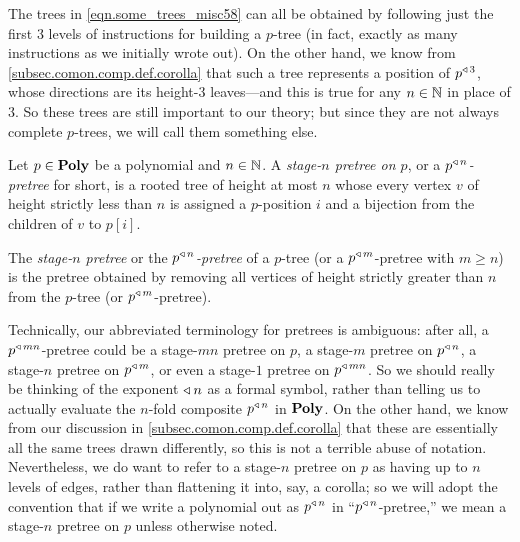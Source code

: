 \documentclass[Book-Poly]{subfiles}
\begin{document}
The trees in \eqref{eqn.some_trees_misc58} can all be obtained by following just the first $3$ levels of instructions for building a $p$-tree (in fact, exactly as many instructions as we initially wrote out).
On the other hand, we know from \cref{subsec.comon.comp.def.corolla} that such a tree represents a position of $p^{\mathbin{\triangleleft}\,3}$, whose directions are its height-$3$ leaves---and this is true for any $n\in\mathbb{N}$ in place of $3$.
So these trees are still important to our theory; but since they are not always complete $p$-trees, we will call them something else.

\begin{definition} \label{def.pretree}
Let $p\in\mathbf{Poly}$ be a polynomial and $n\in\mathbb{N}$.
A \emph{stage-$n$ pretree on $p$}, or a \emph{$p^{\mathbin{\triangleleft}\,n}$-pretree} for short, is a rooted tree of height at most $n$ whose every vertex $v$ of height strictly less than $n$ is assigned a $p$-position $i$ and a bijection from the children of $v$ to $p[i]$.

The \emph{stage-$n$ pretree} or the \emph{$p^{\mathbin{\triangleleft}\,n}$-pretree} of a $p$-tree (or a $p^{\mathbin{\triangleleft}\,m}$-pretree with $m\geq n$) is the pretree obtained by removing all vertices of height strictly greater than $n$ from the $p$-tree (or $p^{\mathbin{\triangleleft}\,m}$-pretree).
\end{definition}

\begin{remark}
Technically, our abbreviated terminology for pretrees is ambiguous: after all, a $p^{\mathbin{\triangleleft}\,mn}$-pretree could be a stage-$mn$ pretree on $p$, a stage-$m$ pretree on $p^{\mathbin{\triangleleft}\,n}$, a stage-$n$ pretree on $p^{\mathbin{\triangleleft}\,m}$, or even a stage-$1$ pretree on $p^{\mathbin{\triangleleft}\,mn}$.
So we should really be thinking of the exponent $\mathbin{\triangleleft}\:n$ as a formal symbol, rather than telling us to actually evaluate the $n$-fold composite $p^{\mathbin{\triangleleft}\,n}$ in $\mathbf{Poly}$.
On the other hand, we know from our discussion in \cref{subsec.comon.comp.def.corolla} that these are essentially all the same trees drawn differently, so this is not a terrible abuse of notation.
Nevertheless, we do want to refer to a stage-$n$ pretree on $p$ as having up to $n$ levels of edges, rather than flattening it into, say, a corolla; so we will adopt the convention that if we write a polynomial out as $p^{\mathbin{\triangleleft}\,n}$ in ``$p^{\mathbin{\triangleleft}\,n}$-pretree,'' we mean a stage-$n$ pretree on $p$ unless otherwise noted.
\end{remark}
\end{document}
